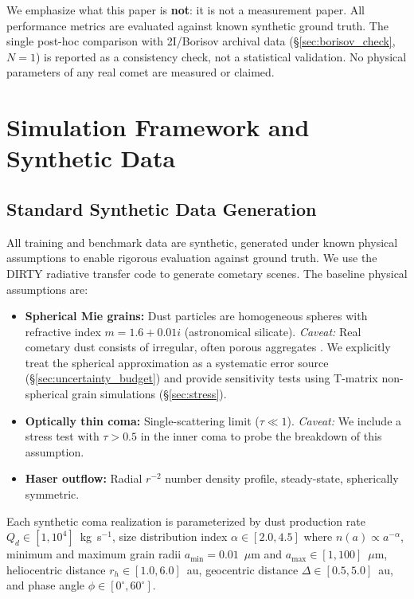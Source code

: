\documentclass[preprint2]{aastex631}
\begin{document}
We emphasize what this paper is \textbf{not}: it is not a measurement paper. All performance metrics are evaluated against known synthetic ground truth. The single post-hoc comparison with 2I/Borisov archival data (\S\ref{sec:borisov_check}, $N=1$) is reported as a consistency check, not a statistical validation. No physical parameters of any real comet are measured or claimed.

\section{Simulation Framework and Synthetic Data}\label{sec:simulation}

\subsection{Standard Synthetic Data Generation}

All training and benchmark data are synthetic, generated under known physical assumptions to enable rigorous evaluation against ground truth. We use the DIRTY radiative transfer code \citep{gordon01} to generate cometary scenes. The baseline physical assumptions are:

\begin{itemize}
    \item \textbf{Spherical Mie grains:} Dust particles are homogeneous spheres with refractive index $m = 1.6 + 0.01i$ (astronomical silicate). \textit{Caveat:} Real cometary dust consists of irregular, often porous aggregates \citep{kolokolova04}. We explicitly treat the spherical approximation as a systematic error source (\S\ref{sec:uncertainty_budget}) and provide sensitivity tests using T-matrix non-spherical grain simulations (\S\ref{sec:stress}).
    \item \textbf{Optically thin coma:} Single-scattering limit ($\tau \ll 1$). \textit{Caveat:} We include a stress test with $\tau > 0.5$ in the inner coma to probe the breakdown of this assumption.
    \item \textbf{Haser outflow:} Radial $r^{-2}$ number density profile, steady-state, spherically symmetric.
\end{itemize}

Each synthetic coma realization is parameterized by dust production rate $Q_d \in [1, 10^4]$~kg~s$^{-1}$, size distribution index $\alpha \in [2.0, 4.5]$ where $n(a) \propto a^{-\alpha}$, minimum and maximum grain radii $a_{\min} = 0.01$~$\mu$m and $a_{\max} \in [1, 100]$~$\mu$m, heliocentric distance $r_h \in [1.0, 6.0]$~au, geocentric distance $\Delta \in [0.5, 5.0]$~au, and phase angle $\phi \in [0^\circ, 60^\circ]$.
\end{document}
